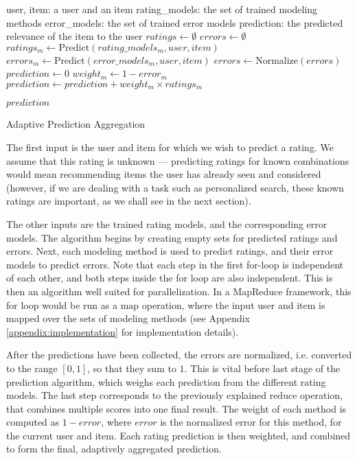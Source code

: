 \begin{algorithm}
  \begin{algorithmic}[1]
  \REQUIRE user, item: a user and an item
  \REQUIRE rating\_models: the set of trained modeling methods 
  \REQUIRE error\_models: the set of trained error models
  \ENSURE  prediction: the predicted relevance of the item to the user
    \STATE $ratings \gets \emptyset$
    \STATE $errors  \gets \emptyset$
      \STATE $ratings_{m} \gets \mathrm{Predict}(rating\_models_m, user, item)$
      \STATE $errors_{m}  \gets \mathrm{Predict}(error\_models_m, user, item)$
    \ENDFOR 
    \STATE $errors \gets \mathrm{Normalize}(errors)$
    \STATE $prediction \gets 0$
      \STATE $weight_m \gets 1 - error_m$
      \STATE $prediction \gets prediction + weight_m \times ratings_m$
    \ENDFOR
 
  \RETURN $prediction$
  \end{algorithmic}
  \caption[Adaptive Prediction Aggregation]{Adaptive Prediction Aggregation
  }
  \label{code:prediction}
\end{algorithm}

The first input is the user and item for which we wish to predict a rating.
We assume that this rating is unknown --- predicting ratings for known combinations
would mean recommending items the user has already seen and considered
(however, if we are dealing with a task such as personalized search,
these known ratings are important, as we shall see in the next section).

The other inputs are the trained rating models, and the corresponding error models.
The algorithm begins by creating empty sets for predicted ratings and errors.
Next, each modeling method is used to predict ratings, and their error models to predict errors.
Note that each step in the first for-loop is independent of each other, and both steps
inside the for loop are also independent. 
This is then an algorithm well suited for parallelization.
In a MapReduce framework, this for loop would be run as a $\mathrm{map}$ operation,
where the input user and item is mapped over the sets of modeling methods
(see Appendix \ref{appendix:implementation} for implementation details).

After the predictions have been collected, the errors are normalized,
i.e. converted to the range $[0,1]$, so that they sum to $1$.
This is vital before last stage of the prediction algorithm,
which weighs each prediction from the different rating models.
The last step corresponds to the previously explained $\mathrm{reduce}$ operation,
that combines multiple scores into one final result.
The weight of each method is computed as $1 - error$, where $error$ 
is the normalized error for this method, for the current user and item.
Each rating prediction is then weighted, and combined to form the final,
adaptively aggregated prediction.

